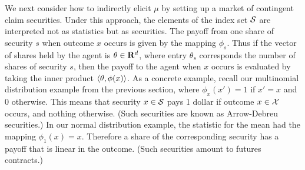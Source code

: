 We next consider how to indirectly elicit $\mu$ by setting up a market of contingent claim securities. Under this approach, the elements of the index set $\mathcal{S}$ are interpreted not as statistics but as securities. The payoff from one share of security $s$ when outcome $x$ occurs is given by the mapping $\phi_s$. Thus if the vector of shares held by the agent is $\theta \in \mathbf{R}^d$, where entry $\theta_s$ corresponds the number of shares of security $s$, then the payoff to the agent when $x$ occurs is evaluated by taking the inner product $\langle \theta, \phi(x) \rangle$. As a concrete example, recall our multinomial distribution example from the previous section, where $\phi_x(x') = 1$ if $x' = x$ and 0 otherwise. This means that security $x \in \mathcal{S}$ pays 1 dollar if outcome $x \in \mathcal{X}$ occurs, and nothing otherwise. (Such securities are known as Arrow-Debreu securities.) In our normal distribution example, the statistic for the mean had the mapping $\phi_1(x) = x$. Therefore a share of the corresponding security has a payoff that is linear in the outcome. (Such securities amount to futures contracts.) 

